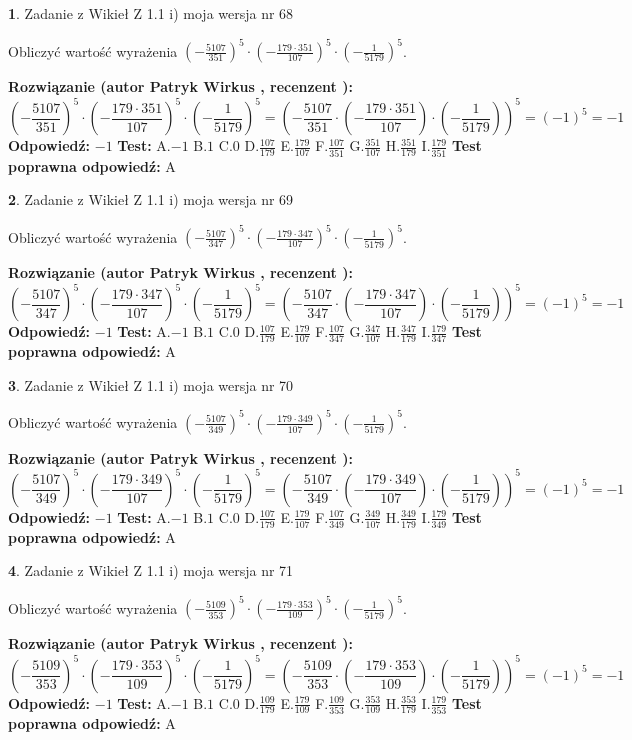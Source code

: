 \documentclass[12pt, a4paper]{article}
\theoremstyle{definition} %
\newtheorem{zad}{}
\newcommand{\zadStart}[1]{\begin{zad}#1\newline}
\newcommand{\zadStop}{\end{zad}}
\newcommand{\rozwStart}[2]{\noindent \textbf{Rozwiązanie (autor #1 , recenzent #2): }\newline}
\newcommand{\rozwStop}{\newline}
\newcommand{\odpStart}{\noindent \textbf{Odpowiedź:}\newline}
\newcommand{\odpStop}{\newline}
\newcommand{\testStart}{\noindent \textbf{Test:}\newline}
\newcommand{\testStop}{\newline}
\newcommand{\kluczStart}{\noindent \textbf{Test poprawna odpowiedź:}\newline}
\newcommand{\kluczStop}{\newline}
\begin{document}
\zadStart{Zadanie z Wikieł Z 1.1 i) moja wersja nr 68}

Obliczyć wartość wyrażenia $(-\frac{5107}{351})^{5} \cdot (-\frac{179 \cdot 351}{107})^{5} \cdot (-\frac{1}{5179})^{5}$.
\zadStop
\rozwStart{Patryk Wirkus}{}
$$(-\frac{5107}{351})^{5} \cdot (-\frac{179 \cdot 351}{107})^{5} \cdot (-\frac{1}{5179})^{5} = (-\frac{5107}{351} \cdot (-\frac{179 \cdot 351}{107}) \cdot (-\frac{1}{5179}))^{5} = (-1)^{5} = -1$$
\rozwStop
\odpStart
$-1$
\odpStop
\testStart
A.$-1$ B.$1$ C.$0$ D.$\frac{107}{179}$ E.$\frac{179}{107}$
F.$\frac{107}{351}$ G.$\frac{351}{107}$
H.$\frac{351}{179}$
I.$\frac{179}{351}$
\testStop
\kluczStart
A
\kluczStop



\zadStart{Zadanie z Wikieł Z 1.1 i) moja wersja nr 69}

Obliczyć wartość wyrażenia $(-\frac{5107}{347})^{5} \cdot (-\frac{179 \cdot 347}{107})^{5} \cdot (-\frac{1}{5179})^{5}$.
\zadStop
\rozwStart{Patryk Wirkus}{}
$$(-\frac{5107}{347})^{5} \cdot (-\frac{179 \cdot 347}{107})^{5} \cdot (-\frac{1}{5179})^{5} = (-\frac{5107}{347} \cdot (-\frac{179 \cdot 347}{107}) \cdot (-\frac{1}{5179}))^{5} = (-1)^{5} = -1$$
\rozwStop
\odpStart
$-1$
\odpStop
\testStart
A.$-1$ B.$1$ C.$0$ D.$\frac{107}{179}$ E.$\frac{179}{107}$
F.$\frac{107}{347}$ G.$\frac{347}{107}$
H.$\frac{347}{179}$
I.$\frac{179}{347}$
\testStop
\kluczStart
A
\kluczStop



\zadStart{Zadanie z Wikieł Z 1.1 i) moja wersja nr 70}

Obliczyć wartość wyrażenia $(-\frac{5107}{349})^{5} \cdot (-\frac{179 \cdot 349}{107})^{5} \cdot (-\frac{1}{5179})^{5}$.
\zadStop
\rozwStart{Patryk Wirkus}{}
$$(-\frac{5107}{349})^{5} \cdot (-\frac{179 \cdot 349}{107})^{5} \cdot (-\frac{1}{5179})^{5} = (-\frac{5107}{349} \cdot (-\frac{179 \cdot 349}{107}) \cdot (-\frac{1}{5179}))^{5} = (-1)^{5} = -1$$
\rozwStop
\odpStart
$-1$
\odpStop
\testStart
A.$-1$ B.$1$ C.$0$ D.$\frac{107}{179}$ E.$\frac{179}{107}$
F.$\frac{107}{349}$ G.$\frac{349}{107}$
H.$\frac{349}{179}$
I.$\frac{179}{349}$
\testStop
\kluczStart
A
\kluczStop



\zadStart{Zadanie z Wikieł Z 1.1 i) moja wersja nr 71}

Obliczyć wartość wyrażenia $(-\frac{5109}{353})^{5} \cdot (-\frac{179 \cdot 353}{109})^{5} \cdot (-\frac{1}{5179})^{5}$.
\zadStop
\rozwStart{Patryk Wirkus}{}
$$(-\frac{5109}{353})^{5} \cdot (-\frac{179 \cdot 353}{109})^{5} \cdot (-\frac{1}{5179})^{5} = (-\frac{5109}{353} \cdot (-\frac{179 \cdot 353}{109}) \cdot (-\frac{1}{5179}))^{5} = (-1)^{5} = -1$$
\rozwStop
\odpStart
$-1$
\odpStop
\testStart
A.$-1$ B.$1$ C.$0$ D.$\frac{109}{179}$ E.$\frac{179}{109}$
F.$\frac{109}{353}$ G.$\frac{353}{109}$
H.$\frac{353}{179}$
I.$\frac{179}{353}$
\testStop
\kluczStart
A
\kluczStop
\end{document}
